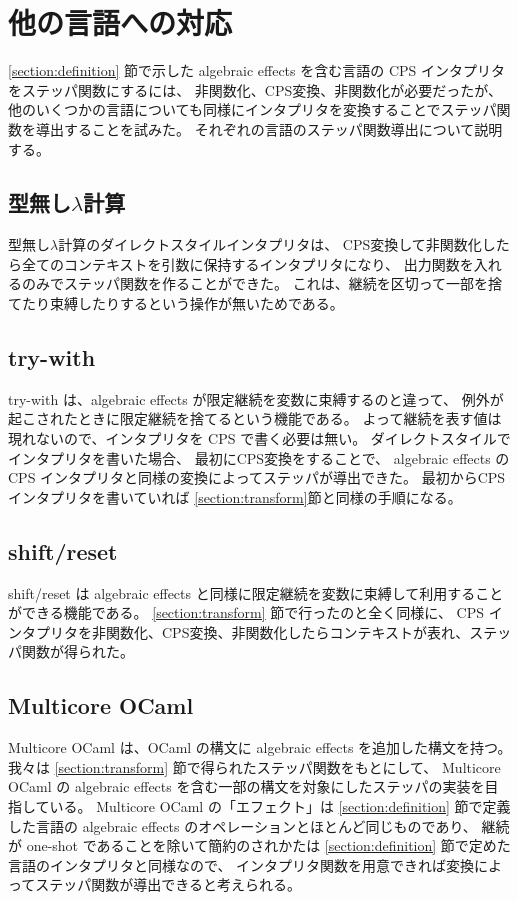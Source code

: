 \section{他の言語への対応}
\label{section:languages}

\ref{section:definition} 節で示した algebraic effects
を含む言語の CPS インタプリタをステッパ関数にするには、
非関数化、CPS変換、非関数化が必要だったが、
他のいくつかの言語についても同様にインタプリタを変換することでステッパ関数を導出することを試みた。
それぞれの言語のステッパ関数導出について説明する。


\subsection{型無し$\lambda$計算}
\label{subsection:lambda}

型無し$\lambda$計算のダイレクトスタイルインタプリタは、
CPS変換して非関数化したら全てのコンテキストを引数に保持するインタプリタになり、
出力関数を入れるのみでステッパ関数を作ることができた。
これは、継続を区切って一部を捨てたり束縛したりするという操作が無いためである。


\subsection{try-with}
\label{subsection:try_with}

try-with は、algebraic effects が限定継続を変数に束縛するのと違って、
例外が起こされたときに限定継続を捨てるという機能である。
よって継続を表す値は現れないので、インタプリタを CPS で書く必要は無い。
ダイレクトスタイルでインタプリタを書いた場合、
最初にCPS変換をすることで、
algebraic effects の CPS インタプリタと同様の変換によってステッパが導出できた。
最初からCPSインタプリタを書いていれば \ref{section:transform}節と同様の手順になる。


\subsection{shift/reset}
\label{subsection:shift/reset}

shift/reset は algebraic effects と同様に限定継続を変数に束縛して利用することができる機能である。
\ref{section:transform} 節で行ったのと全く同様に、
CPS インタプリタを非関数化、CPS変換、非関数化したらコンテキストが表れ、ステッパ関数が得られた。


\subsection{Multicore OCaml}
\label{subsection:multicore_ocaml}

Multicore OCaml は、OCaml の構文に algebraic effects を追加した構文を持つ。
我々は \ref{section:transform} 節で得られたステッパ関数をもとにして、
Multicore OCaml の algebraic effects を含む一部の構文を対象にしたステッパの実装を目指している。
Multicore OCaml の「エフェクト」は \ref{section:definition}
節で定義した言語の algebraic effects のオペレーションとほとんど同じものであり、
継続が one-shot であることを除いて簡約のされかたは \ref{section:definition}
節で定めた言語のインタプリタと同様なので、
インタプリタ関数を用意できれば変換によってステッパ関数が導出できると考えられる。
